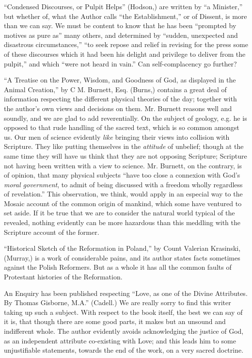 ``Condensed Discourses, or Pulpit Helps'' (Hodson,)
are written by ``a Minister,'' but whether of, what the Author calls ``the
Establishment,'' or of Dissent, is more than we can say. We must be
content to know that he has been ``prompted by motives as pure as'' many
others, and determined by ``sudden, unexpected and disastrous
circumstances,'' ``to seek repose and relief in revising for the press
some of these discourses which it had been his delight and privilege to
deliver from the pulpit,'' and which ``were not heard in vain.'' Can
self-complacency go further?

``A Treatise on the Power, Wisdom, and Goodness of
God, as displayed in the Animal Creation,'' by C M. Burnett, Esq.
(Burns,) contains a great deal of information respecting the different
physical theories of the day; together with the author's own views and
decisions on them. Mr. Burnett reasons well and soundly, and we are glad
to add reverentially. On the subject of geology, e.g. he is opposed to
that rude handling of the sacred text, which is so common amongst us.
Our men of science evidently \emph{like} bringing their views into
collision with Scripture. They like putting themselves in the \emph{attitude}
of unbelief; though at the same time they will have us think that they
are not opposing Scripture; Scripture not having been written with a
view to science. Mr. Burnett, on the contrary, is of opinion, that many
physical subjects ``have too close a connexion with God's \emph{moral
government}, to admit of being discussed with a freedom wholly
regardless of revelation.'' This observation, we think, would apply in an
especial way to the Mosaic account of the common origin of mankind,
which some have ventured to set aside. If it be true that we are to
consider the natural world typical of the revealed, nothing evidently
can be more hazardous than this meddling with the Scripture account of
the former.

``Historical Sketch of the Reformation in Poland,''
by Count Valerian Krasinski, (Murray,) is a work of considerable pains,
and its author states facts sometimes against the Polish Reformers. But
as a whole it has all the common faults of Protestant histories of the
Reformation.

An Enquiry has been published respecting ``Love, as
one of the Divine Attributes. By Thomas Gisborne, M.A.'' (Cadell.) We are
really sorry to find this writer taking up such a subject. With respect
to the book itself, the best we can say of it is, that though there are
some good parts, it makes but an unsound and indifferent whole. The
author evidently avoids acknowledging the justice of God, as an
independent attribute co-existing with Love; and this leads him to some
unjustifiable statements, towards the end of the work, on a very sacred
doctrine.


